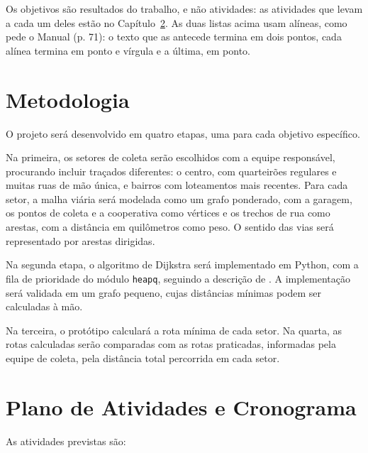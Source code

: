 \documentclass[tcc-proposta]{texufpel}
\begin{document}
Os objetivos são resultados do trabalho, e não atividades: as atividades que
levam a cada um deles estão no Capítulo~\ref{cap:atividades}. As duas listas
acima usam alíneas, como pede o Manual (p. 71): o texto que as antecede termina
em dois pontos, cada alínea termina em ponto e vírgula e a última, em ponto.

\chapter{Metodologia}

O projeto será desenvolvido em quatro etapas, uma para cada objetivo
específico.

Na primeira, os setores de coleta serão escolhidos com a equipe responsável,
procurando incluir traçados diferentes: o centro, com quarteirões regulares e
muitas ruas de mão única, e bairros com loteamentos mais recentes. Para cada
setor, a malha viária será modelada como um grafo ponderado, com a garagem, os
pontos de coleta e a cooperativa como vértices e os trechos de rua como
arestas, com a distância em quilômetros como peso. O sentido das vias será
representado por arestas dirigidas.

Na segunda etapa, o algoritmo de Dijkstra será implementado em Python, com a
fila de prioridade do módulo \texttt{heapq}, seguindo a descrição de
\citet{Cormen:2022:IA}. A implementação será validada em um grafo pequeno,
cujas distâncias mínimas podem ser calculadas à mão.

Na terceira, o protótipo calculará a rota mínima de cada setor. Na quarta, as
rotas calculadas serão comparadas com as rotas praticadas, informadas pela
equipe de coleta, pela distância total percorrida em cada setor.

\chapter{Plano de Atividades e Cronograma}
\label{cap:atividades}

As atividades previstas são:
\end{document}
